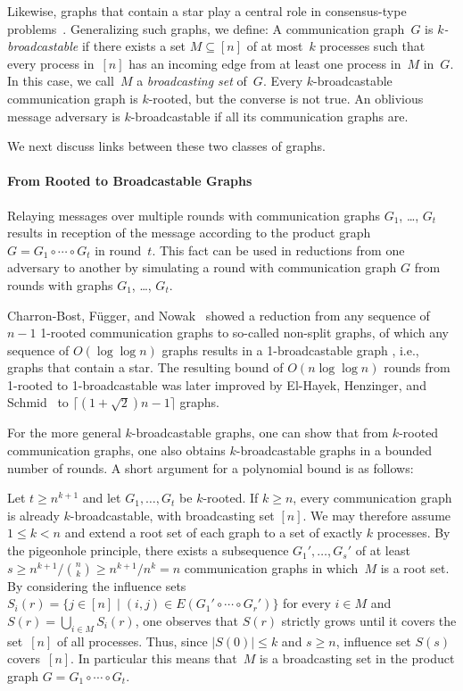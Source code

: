 \documentclass[preprint,12pt,a4paper]{elsarticle}
\theoremstyle{plain}
\theoremstyle{definition}
\renewcommand{\leq}{\leqslant}
\renewcommand{\geq}{\geqslant}
\begin{document}
Likewise, graphs that contain a star play a central role in consensus-type problems~\cite{charron09:HO}.
Generalizing such graphs, we define:
A communication graph~$G$ is \emph{$k$-broadcastable} if there exists a set
$M\subseteq[n]$ of at most~$k$ processes such that every process in~$[n]$
has an incoming edge from at least one process in~$M$ in~$G$.
In this case, we call~$M$ a \emph{broadcasting set} of~$G$.
Every $k$-broadcastable communication graph is $k$-rooted, but the converse is
not true.
An oblivious message adversary is $k$-broadcastable if all its communication graphs are.

We next discuss links between these two classes of graphs.


\paragraph*{From Rooted to Broadcastable Graphs}

Relaying messages over multiple rounds with communication graphs $G_1$, \dots, $G_t$ results in reception of the message according to the product graph $G = G_1 \circ\cdots\circ G_t$ in round~$t$.
This fact can be used in reductions from one adversary to another by simulating a round with communication graph $G$ from rounds with graphs $G_1$, \dots, $G_t$.

Charron-Bost, Függer, and Nowak~\cite{CBFN15:icalp} showed a reduction from any sequence of $n-1$ 1-rooted communication graphs to so-called non-split graphs, of which any sequence of $O(\log\log n)$ graphs results in a 1-broadcastable graph \cite{fugger2020radius}, i.e., graphs that contain a star.
The resulting bound of $O(n \log\log n)$ rounds from 1-rooted to 1-broadcastable was later improved by El-Hayek, Henzinger, and Schmid~\cite{el2023asymptotically} to $\lceil(1+\sqrt{2})n-1\rceil$ graphs.

For the more general $k$-broadcastable graphs, one can show that from $k$-rooted communication graphs, one also obtains $k$-broadcastable graphs in a bounded number of rounds.
A short argument for a polynomial bound is as follows:

Let $t \geq n^{k+1}$ and let $G_1,\dots,G_t$ be $k$-rooted.
If $k\geq n$, every communication graph is already $k$-broadcastable, with broadcasting set $[n]$.
We may therefore assume $1\leq k<n$ and extend a root set of each graph to a set of exactly $k$ processes.
By the pigeonhole principle, there exists a subsequence $G_1',\dots,G_s'$ of at least
$s \geq n^{k+1}/\binom{n}{k}\geq n^{k+1}/n^k = n$ communication graphs in which~$M$ is a root set.
By considering the influence sets
$S_i(r) = \big\{ j\in[n] \mid (i,j) \in E(G_1'\circ \cdots \circ G_r') \big\}$ for every $i\in M$ and
$S(r) = \bigcup_{i \in M} S_i(r)$,
one observes that $S(r)$ strictly grows until it covers the set~$[n]$ of all processes.
Thus, since $\lvert S(0)\rvert \leq k$ and $s \geq n$, influence set $S(s)$ covers~$[n]$.
In particular this means that~$M$ is a broadcasting set in the product graph $G = G_1\circ\cdots\circ G_t$.
\end{document}
